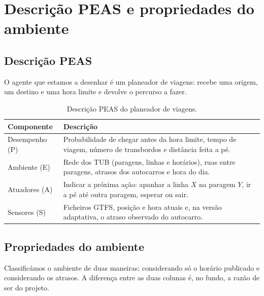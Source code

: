 \documentclass[11pt,a4paper]{article}
\begin{document}
\section{Descrição PEAS e propriedades do ambiente}
\label{sec:peas}

\subsection{Descrição PEAS}

O agente que estamos a desenhar é um planeador de viagens: recebe uma
origem, um destino e uma hora limite e devolve o percurso a fazer.

\begin{table}[H]
\centering
\begin{tabularx}{\textwidth}{@{}l L@{}}
\toprule
\textbf{Componente} & \textbf{Descrição} \\
\midrule
Desempenho (P) &
  Probabilidade de chegar antes da hora limite, tempo de viagem,
  número de transbordos e distância feita a pé. \\[0.3em]
Ambiente (E) &
  Rede dos TUB (paragens, linhas e horários), ruas entre paragens,
  atrasos dos autocarros e hora do dia. \\[0.3em]
Atuadores (A) &
  Indicar a próxima ação: apanhar a linha $X$ na paragem $Y$,
  ir a pé até outra paragem, esperar ou sair. \\[0.3em]
Sensores (S) &
  Ficheiros GTFS, posição e hora atuais e, na versão adaptativa,
  o atraso observado do autocarro. \\
\bottomrule
\end{tabularx}
\caption{Descrição PEAS do planeador de viagens.}
\end{table}

\subsection{Propriedades do ambiente}

Classificámos o ambiente de duas maneiras: considerando só o horário
publicado e considerando os atrasos. A diferença entre as duas colunas
é, no fundo, a razão de ser do projeto.
\end{document}
